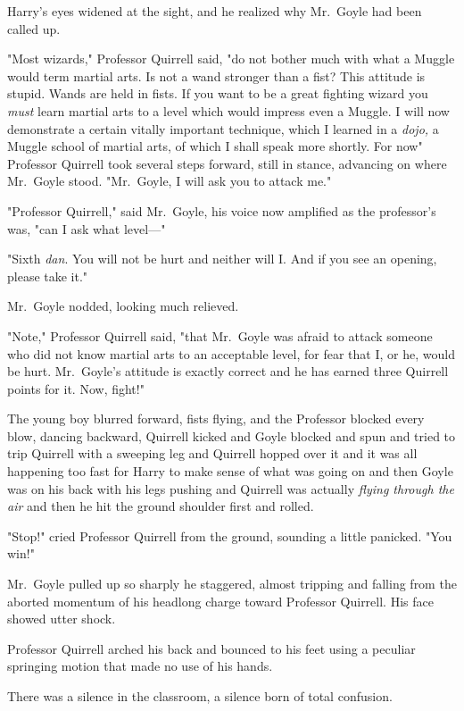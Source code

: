 Harry's eyes widened at the sight, and he realized why Mr.~Goyle had been
called up.

"Most wizards," Professor Quirrell said, "do not bother much with what a Muggle
would term martial arts. Is not a wand stronger than a fist? This attitude is
stupid. Wands are held in fists. If you want to be a great fighting wizard you
\emph{must} learn martial arts to a level which would impress even a Muggle. I
will now demonstrate a certain vitally important technique, which I learned in
a \emph{dojo,} a Muggle school of martial arts, of which I shall speak more
shortly. For now{\el}" Professor Quirrell took several steps forward, still
in stance, advancing on where Mr.~Goyle stood. "Mr.~Goyle, I will ask you to
attack me."

"Professor Quirrell," said Mr.~Goyle, his voice now amplified as the
professor's was, "can I ask what level\mbox{---}"

"Sixth \emph{dan}. You will not be hurt and neither will I. And if you see an
opening, please take it."

Mr.~Goyle nodded, looking much relieved.

"Note," Professor Quirrell said, "that Mr.~Goyle was afraid to attack someone
who did not know martial arts to an acceptable level, for fear that I, or he,
would be hurt. Mr.~Goyle's attitude is exactly correct and he has earned three
Quirrell points for it. Now, fight!"

The young boy blurred forward, fists flying, and the Professor blocked every
blow, dancing backward, Quirrell kicked and Goyle blocked and spun and tried to
trip Quirrell with a sweeping leg and Quirrell hopped over it and it was all
happening too fast for Harry to make sense of what was going on and then Goyle
was on his back with his legs pushing and Quirrell was actually \emph{flying
through the air} and then he hit the ground shoulder first and rolled.

"Stop!" cried Professor Quirrell from the ground, sounding a little panicked.
"You win!"

Mr.~Goyle pulled up so sharply he staggered, almost tripping and falling from
the aborted momentum of his headlong charge toward Professor Quirrell. His face
showed utter shock.

Professor Quirrell arched his back and bounced to his feet using a peculiar
springing motion that made no use of his hands.

There was a silence in the classroom, a silence born of total confusion.

